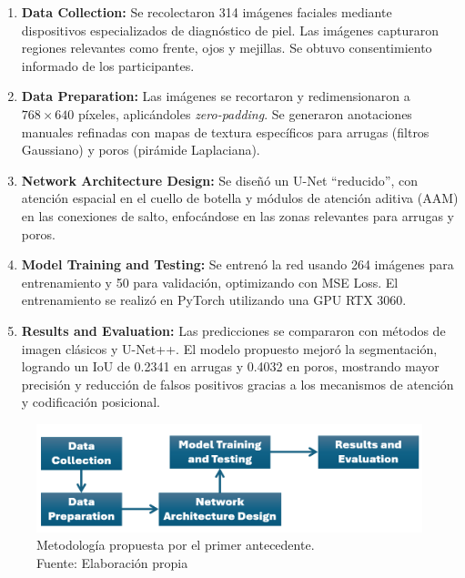 \begin{enumerate}[label=\textbf{\arabic*.}, leftmargin=2em]
    \item \textbf{Data Collection:} Se recolectaron 314 imágenes faciales mediante dispositivos especializados de diagnóstico de piel. Las imágenes capturaron regiones relevantes como frente, ojos y mejillas. Se obtuvo consentimiento informado de los participantes.
    \item \textbf{Data Preparation:} Las imágenes se recortaron y redimensionaron a $768 \times 640$ píxeles, aplicándoles \textit{zero-padding}. Se generaron anotaciones manuales refinadas con mapas de textura específicos para arrugas (filtros Gaussiano) y poros (pirámide Laplaciana).
    \item \textbf{Network Architecture Design:} Se diseñó un U-Net “reducido”, con atención espacial en el cuello de botella y módulos de atención aditiva (AAM) en las conexiones de salto, enfocándose en las zonas relevantes para arrugas y poros.
    \item \textbf{Model Training and Testing:} Se entrenó la red usando 264 imágenes para entrenamiento y 50 para validación, optimizando con MSE Loss. El entrenamiento se realizó en PyTorch utilizando una GPU RTX 3060.
    \item \textbf{Results and Evaluation:} Las predicciones se compararon con métodos de imagen clásicos y U-Net++. El modelo propuesto mejoró la segmentación, logrando un IoU de 0.2341 en arrugas y 0.4032 en poros, mostrando mayor precisión y reducción de falsos positivos gracias a los mecanismos de atención y codificación posicional.
\end{enumerate}

\begin{figure}[H]
	\begin{center}
		\includegraphics[width=1\textwidth]{2/figures/metoant1.png}
		\caption[Metodología propuesta por el primer antecedente]{Metodología propuesta por el primer antecedente.\\
			Fuente: Elaboración propia}
		\label{2:figant1}
	\end{center}
\end{figure}

